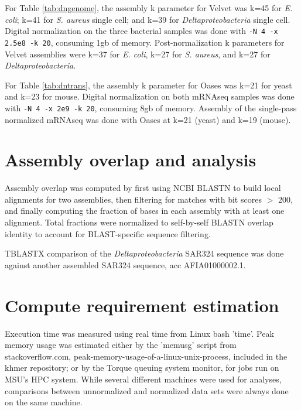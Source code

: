 \documentclass{pnastwo}
\begin{document}
\begin{article}
\begin{materials}
For Table \ref{tab:dngenome}, the assembly k parameter for Velvet was
k=45 for {\em E. coli}; k=41 for {\em S. aureus} single cell; and k=39
for {\em Deltaproteobacteria} single cell.  Digital normalization
on the three bacterial samples was done with {\tt -N 4 -x 2.5e8 -k 20},
consuming 1gb of memory.  Post-normalization k parameters for Velvet
assemblies were k=37 for {\em E. coli}, k=27 for {\em S. aureus}, and k=27 for {\em Deltaproteobacteria}.

For Table \ref{tab:dntrans}, the assembly k parameter for Oases was k=21 for yeast
and k=23 for mouse.  Digital normalization on both mRNAseq samples was done
with {\tt -N 4 -x 2e9 -k 20}, consuming 8gb of memory.  Assembly of the
single-pass normalized mRNAseq was done with Oases at k=21 (yeast) and k=19
(mouse).

\section{Assembly overlap and analysis}

Assembly overlap was computed by first using NCBI BLASTN to build local
alignments for two assemblies, then filtering for matches with bit scores
$>$ 200, and finally computing the fraction of bases in each assembly
with at least one alignment.  Total fractions were normalized to
self-by-self BLASTN overlap identity to account for BLAST-specific
sequence filtering.

TBLASTX comparison of the {\em Deltaproteobacteria} SAR324 sequence
was done against another assembled SAR324 sequence, acc AFIA01000002.1.

\section{Compute requirement estimation}

Execution time was measured using real time from Linux bash 'time'.
Peak memory usage was estimated either by the 'memusg' script from
stackoverflow.com, peak-memory-usage-of-a-linux-unix-process, included
in the khmer repository; or by the Torque queuing system monitor, for
jobs run on MSU's HPC system.  While several different machines were
used for analyses, comparisons between unnormalized and normalized
data sets were always done on the same machine.

\end{materials}

\begin{acknowledgments}


\end{acknowledgments}
\end{article}
\end{document}
